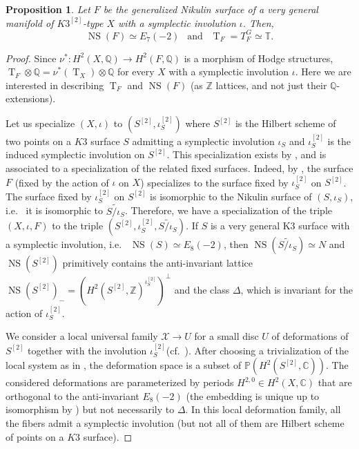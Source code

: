 \documentclass{amsart}
\newtheorem{prop}[thm]{Proposition}
\theoremstyle{definition}
\numberwithin{equation}{section}
\numberwithin{equation}{section} \theoremstyle{definition}
\DeclareMathOperator{\NS}{NS}
\DeclareMathOperator{\T}{T}
\newcommand\PP{{\mathbb{P}}}
\newcommand\Q{\mathbb Q}
\newcommand\Z{\mathbb{Z}}
\begin{document}
\begin{prop}\label{main-prop} \label{cor: very general F has NS=G}
    Let $F$ be the generalized Nikulin surface of a very general manifold of $K3^{[2]}$-type $X$ with a symplectic involution $\iota$. Then,$$\NS(F)\simeq E_7(-2)\ \ \mbox{ and }\ \ \T_F=T_F^G\simeq \mathbb{T}.$$
\end{prop}
\begin{proof}
Since $\nu^*\colon H^2(X,\mathbb Q)\to H^2(F,\mathbb Q)$ is a morphism of Hodge structures, $\T_F\otimes \Q=\nu^*(\T_X)\otimes \Q$ for every $X$ with a symplectic involution $\iota$. Here we are interested in describing $\T_F$ and $\NS(F)$ (as $\Z$ lattices, and not just their $\Q$-extensions). 


Let us  specialize $(X,\iota)$ to $(S^{[2]},\iota_S^{[2]})$ where $S^{[2]}$ is the Hilbert scheme of two points on a $K3$ surface $S$ admitting a symplectic involution $\iota_S$ and $\iota_S^{[2]}$ is the induced symplectic involution on $S^{[2]}$. This specialization exists by \cite{Mon}, and is associated to a specialization of the related fixed surfaces. Indeed, by \cite[proof of Proposition 4.6]{Mon}, the surface $F$ (fixed by the action of $\iota$ on $X$) specializes to the surface fixed by $\iota_S^{[2]}$ on $S^{[2]}$. The surface fixed by $\iota_S^{[2]}$ on $S^{[2]}$ is isomorphic to the Nikulin surface of $(S, \iota_S)$, i.e.~ it is isomorphic to $\widetilde{S/\iota_S}$. Therefore, we have a specialization of the triple $(X,\iota,F)$ to the triple $(S^{[2]},\iota_S^{[2]}, \widetilde{S/\iota_S})$. If $S$ is a very general K3 surface with a symplectic involution, i.e.~ $\NS(S)\simeq E_8(-2)$, then $\NS(\widetilde{S/\iota_S})\simeq N$ and $\NS(S^{[2]})$ primitively contains the anti-invariant lattice $\NS(S^{[2]})_-=(H^2(S^{[2]},\Z)^{\iota_S^{[2]}})^{\perp}$ and the class $\Delta$, which is invariant for the action of $\iota_S^{[2]}$.

We consider a local universal family $\mathcal{X}\to U$ for a small disc $U$ of deformations of $S^{[2]}$ together with the involution $\iota_S^{[2]}$(cf.~\cite[p.1480]{Mon}).
After choosing a trivialization of the local system as in \cite[p 1481]{Mon}, the deformation space is a subset of $\PP(H^2(S^{[2]},\mathbb C))$. The considered deformations are parameterized by periods $H^{2,0} \in H^2(X,\mathbb C)$ that are orthogonal to the anti-invariant $E_8(-2)$ (the embedding is unique up to isomorphism by \cite[Corollary 5.3]{Mon}) but not necessarily to $\Delta$. In this local deformation family, all the fibers admit a symplectic involution (but not all of them are Hilbert scheme of points on a $K3$ surface).


\end{proof}
\end{document}
